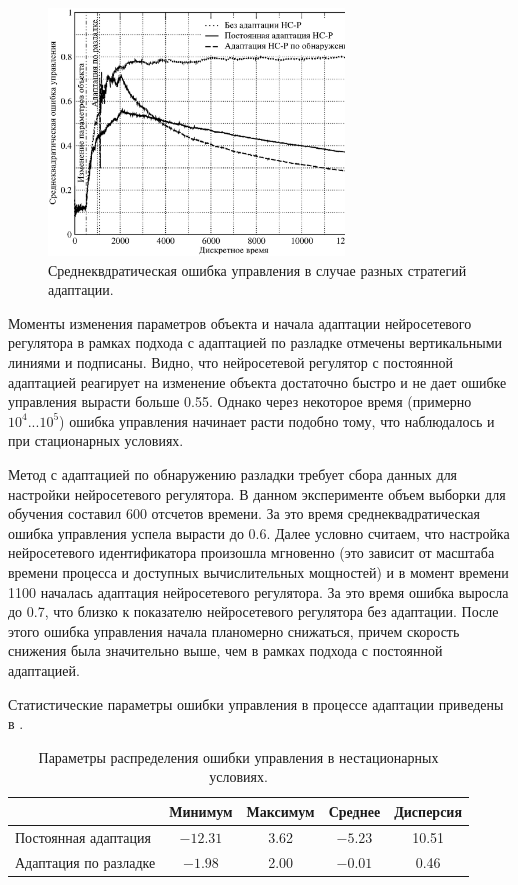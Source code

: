 \begin{figure}[h]
\centering
\includegraphics[width=0.7\textwidth,%
  height=0.3\textheight]{nonst_cmp_pa_ma_rus}
\caption{Среднеквдратическая ошибка управления в случае разных
  стратегий адаптации.}
\label{fig:nonst_cmp_pa_ma_rus}
\end{figure}

Моменты изменения параметров объекта и начала адаптации нейросетевого
регулятора в рамках подхода с адаптацией по разладке отмечены
вертикальными линиями и подписаны.  Видно, что нейросетевой регулятор
с постоянной адаптацией реагирует на изменение объекта достаточно
быстро и не дает ошибке управления вырасти больше 0.55.  Однако через
некоторое время (примерно $10^4...10^5$) ошибка управления начинает
расти подобно тому, что наблюдалось и при стационарных условиях.

Метод с адаптацией по обнаружению разладки требует сбора данных для
настройки нейросетевого регулятора.  В данном эксперименте объем
выборки для обучения составил 600 отсчетов времени.  За это время
среднеквадратическая ошибка управления успела вырасти до 0.6.  Далее
условно считаем, что настройка нейросетевого идентификатора произошла
мгновенно (это зависит от масштаба времени процесса и доступных
вычислительных мощностей) и в момент времени 1100 началась адаптация
нейросетевого регулятора.  За это время ошибка выросла до 0.7, что
близко к показателю нейросетевого регулятора без адаптации.  После
этого ошибка управления начала планомерно снижаться, причем скорость
снижения была значительно выше, чем в рамках подхода с постоянной
адаптацией.

Статистические параметры ошибки управления в процессе адаптации
приведены в .

\begin{table}
  \caption{Параметры распределения ошибки управления в нестационарных условиях.}
  \label{tabl:nonst_state_distrib}
  \begin{tabular}{|l|c|c|c|c|}
    \hline
    & Минимум & Максимум & Среднее & Дисперсия\\
    \hline
    Постоянная адаптация&
    $-12.31$ & 3.62 & $-5.23$ & 10.51\\
    \hline
    Адаптация по разладке&
    $-1.98$ & 2.00 & $-0.01$ & 0.46\\
    \hline
  \end{tabular}
\end{table}

